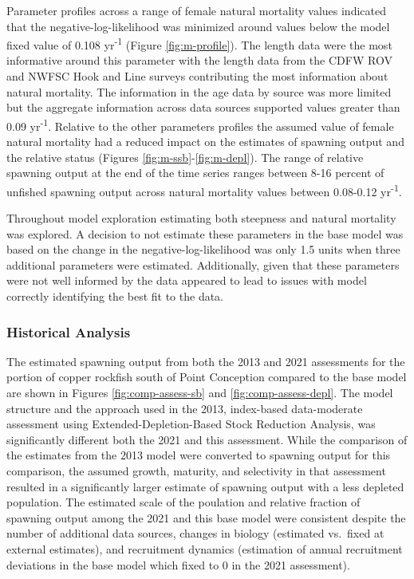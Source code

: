 \documentclass[11pt,
  english,
  letterpaper,
]{article}
\begin{document}
Parameter profiles across a range of female natural mortality values indicated that the negative-log-likelihood was minimized around values below the model fixed value of 0.108 yr\textsuperscript{-1} (Figure \ref{fig:m-profile}). The length data were the most informative around this parameter with the length data from the CDFW ROV and NWFSC Hook and Line surveys contributing the most information about natural mortality. The information in the age data by source was more limited but the aggregate information across data sources supported values greater than 0.09 yr\textsuperscript{-1}. Relative to the other parameters profiles the assumed value of female natural mortality had a reduced impact on the estimates of spawning output and the relative status (Figures \ref{fig:m-ssb}-\ref{fig:m-depl}). The range of relative spawning output at the end of the time series ranges between 8-16 percent of unfished spawning output across natural mortality values between 0.08-0.12 yr\textsuperscript{-1}.

Throughout model exploration estimating both steepness and natural mortality was explored. A decision to not estimate these parameters in the base model was based on the change in the negative-log-likelihood was only 1.5 units when three additional parameters were estimated. Additionally, given that these parameters were not well informed by the data appeared to lead to issues with model correctly identifying the best fit to the data.

\hypertarget{historical-analysis}{%
\subsubsection{Historical Analysis}\label{historical-analysis}}

The estimated spawning output from both the 2013 and 2021 assessments for the portion of copper rockfish south of Point Conception compared to the base model are shown in Figures \ref{fig:comp-assess-sb} and \ref{fig:comp-assess-depl}. The model structure and the approach used in the 2013, index-based data-moderate assessment using Extended-Depletion-Based Stock Reduction Analysis, was significantly different both the 2021 and this assessment. While the comparison of the estimates from the 2013 model were converted to spawning output for this comparison, the assumed growth, maturity, and selectivity in that assessment resulted in a significantly larger estimate of spawning output with a less depleted population. The estimated scale of the poulation and relative fraction of spawning output among the 2021 and this base model were consistent despite the number of additional data sources, changes in biology (estimated vs.~fixed at external estimates), and recruitment dynamics (estimation of annual recruitment deviations in the base model which fixed to 0 in the 2021 assessment).
\end{document}
